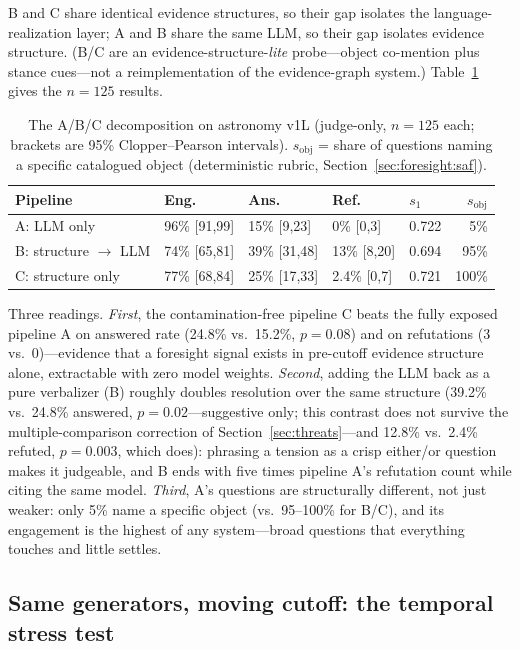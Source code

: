 B and C share identical evidence structures, so their gap isolates the
language-realization layer; A and B share the same LLM, so their gap
isolates evidence structure. (B/C are an evidence-structure-\emph{lite}
probe---object co-mention plus stance cues---not a reimplementation of
the evidence-graph system.) Table~\ref{tab:abc} gives the $n=125$
results.

\begin{table}[t]
  \centering
  \small
  \caption{The A/B/C decomposition on astronomy v1L (judge-only,
  $n=125$ each; brackets are 95\% Clopper--Pearson intervals).
  $s_{\mathrm{obj}}$ = share of questions naming a specific catalogued
  object (deterministic rubric, Section~\ref{sec:foresight:saf}).}
  \label{tab:abc}
  \begin{tabular}{@{}lllllr@{}}
    \toprule
    Pipeline & Eng. & Ans. & Ref. & $s_1$ & $s_{\mathrm{obj}}$ \\
    \midrule
    A: LLM only              & 96\% [91,99] & 15\% [9,23]  & 0\% [0,3]   & 0.722 & 5\% \\
    B: structure $\to$ LLM   & 74\% [65,81] & 39\% [31,48] & 13\% [8,20] & 0.694 & 95\% \\
    C: structure only        & 77\% [68,84] & 25\% [17,33] & 2.4\% [0,7] & 0.721 & 100\% \\
    \bottomrule
  \end{tabular}
\end{table}

Three readings. \emph{First}, the contamination-free pipeline C beats
the fully exposed pipeline A on answered rate (24.8\% vs.\ 15.2\%,
$p=0.08$) and on refutations (3 vs.\ 0)---evidence that a foresight
signal exists in pre-cutoff evidence structure alone, extractable with
zero model weights. \emph{Second}, adding the LLM back as a pure
verbalizer (B) roughly doubles resolution over the same structure
(39.2\% vs.\ 24.8\% answered, $p=0.02$---suggestive only; this
contrast does not survive the multiple-comparison correction of
Section~\ref{sec:threats}---and 12.8\% vs.\ 2.4\% refuted, $p=0.003$,
which does): phrasing a tension as a crisp either/or question makes it
judgeable, and B ends with five times pipeline A's refutation count
while citing the same model. \emph{Third}, A's questions are
structurally different, not just weaker: only 5\% name a specific
object (vs.\ 95--100\% for B/C), and its engagement is the highest of
any system---broad questions that everything touches and little
settles.

\subsection{Same generators, moving cutoff: the temporal stress test}
\label{sec:foresight:stress}

